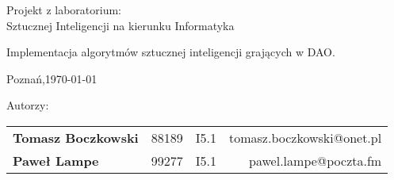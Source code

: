 \thispagestyle{empty} %

\begin{center}
{\large{Projekt z laboratorium:\\
Sztucznej Inteligencji na kierunku Informatyka }}

\vspace{3ex}

Implementacja algorytmów sztucznej inteligencji grających w DAO.

\vspace{3ex}
{\footnotesize Poznań,\today}

\end{center}


\vspace{10ex}


\vspace{5ex}

Autorzy:
\begin{tabular}{lllr}
\textbf{Tomasz Boczkowski} & 88189 & I5.1 & tomasz.boczkowski@onet.pl \\
\textbf{Paweł Lampe} & 99277 & I5.1 & pawel.lampe@poczta.fm \\
\end{tabular}

\vspace{5ex}



\newpage

